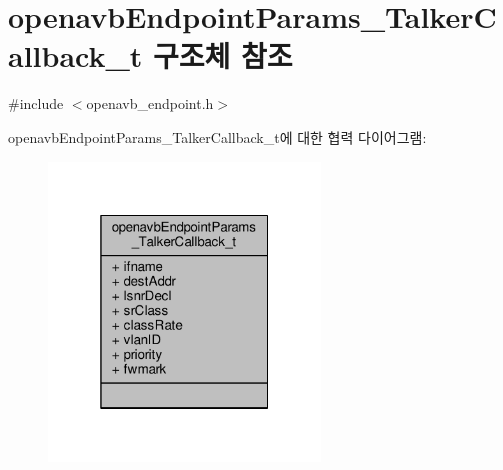 \hypertarget{structopenavb_endpoint_params___talker_callback__t}{}\section{openavb\+Endpoint\+Params\+\_\+\+Talker\+Callback\+\_\+t 구조체 참조}
\label{structopenavb_endpoint_params___talker_callback__t}


{\ttfamily \#include $<$openavb\+\_\+endpoint.\+h$>$}



openavb\+Endpoint\+Params\+\_\+\+Talker\+Callback\+\_\+t에 대한 협력 다이어그램\+:
\nopagebreak
\begin{figure}[H]
\begin{center}
\leavevmode
\includegraphics[width=205pt]{structopenavb_endpoint_params___talker_callback__t__coll__graph}
\end{center}
\end{figure}

